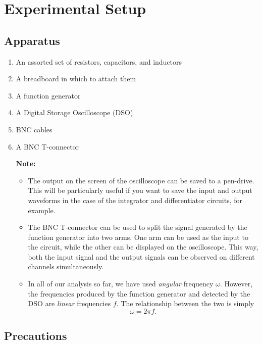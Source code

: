 \section*{Experimental Setup}

\subsection*{Apparatus}

\begin{enumerate}[label=\arabic*)]
\itemsep0em
\item An assorted set of resistors, capacitors, and inductors
\item A breadboard in which to attach them
\item A function generator
\item A Digital Storage Oscilloscope (DSO)
\item BNC cables
\item A BNC T-connector

\vspace{\parskip}
\begin{imp}
\textbf{Note:}
\begin{itemize}
    \item The output on the screen of the oscilloscope can be saved to a pen-drive. This will be particularly useful if you want to save the input and output waveforms in the case of the integrator and differentiator circuits, for example.
    \item The BNC T-connector can be used to split the signal generated by the function generator into two arms. One arm can be used as the input to the circuit, while the other can be displayed on the oscilloscope. This way, both the input signal and the output signals can be observed on different channels simultaneously.
    \item In all of our analysis so far, we have used \textsl{angular} frequency $\omega$. However, the frequencies produced by the function generator and detected by the DSO are \textsl{linear} frequencies $f$. The relationship between the two is simply
    \begin{equation}
        \omega = 2 \pi f.
    \end{equation}
\end{itemize}
\end{imp}

\end{enumerate}

\subsection*{Precautions}

